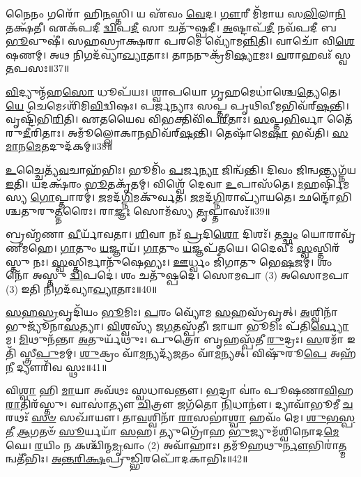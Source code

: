 𑌨𑍈𑌨𑌂 𑌗𑌰𑍋᳴ 𑌹𑌿\-\ul{𑌨}\-𑌸𑍍𑌤𑌿। 𑌯 𑌏᳴𑌵𑌂 \ul{𑌵𑍇}\-𑌦। 
\-\ul{𑌗𑍗}\-𑌰𑍀 𑌮𑌿᳴𑌮𑌾𑌯 𑌸\-\ul{𑌲𑌿}\-𑌲𑌾\-\ul{𑌨𑌿} 𑌤𑌕𑍍𑌷᳴𑌤𑍀। 𑌏𑌕᳴𑌪𑌦𑍀 \ul{𑌦𑍍𑌵𑌿}\-𑌪\-\ul{𑌦𑍀} 𑌸𑌾 𑌚𑌤𑍁᳴𑌷𑍍𑌪𑌦𑍀। 
\-\ul{𑌅}\-𑌷𑍍𑌟𑌾𑌪᳴\-\ul{𑌦𑍀} 𑌨𑌵᳴𑌪𑌦𑍀 𑌬\-\ul{𑌭𑍂}\-𑌵𑍁𑌷𑍀॑। 𑌸𑌹𑌸𑍍𑌰𑌾𑌕𑍍𑌷𑌰𑌾 𑌪𑌰𑌮𑍇 𑌵𑍍𑌯𑍋᳴𑌮\-\ul{𑌨𑍍𑌨𑌿}\-𑌤𑌿। 
𑌵𑌾𑌚𑍋᳴ 𑌵𑌿\-\ul{𑌶𑍇}\-𑌷𑌣𑌮𑍍। 𑌅𑌥 𑌨𑌿𑌗𑌦᳴𑌵𑍍𑌯𑌾\-\ul{𑌖𑍍𑌯𑌾}\-𑌤𑌾𑌃। 
𑌤𑌾𑌨𑌨𑍁𑌕𑍍𑌰᳴𑌮𑌿\-\ul{𑌷𑍍𑌯𑌾}\-𑌮𑌃। \ul{𑌵}\-𑌰𑌾𑌹𑌵𑌃᳴ 𑌸𑍍𑌵\-\ul{𑌤}\-𑌪𑌸𑌃॥37॥

\-\ul{𑌵𑌿}\-𑌦𑍍𑌯𑍁𑌨𑍍𑌮᳴𑌹\-\ul{𑌸𑍋} 𑌧𑍂𑌪᳴𑌯𑌃। 𑌶𑍍𑌵𑌾𑌪𑌯𑍋 𑌗𑍃𑌹𑌮𑍇𑌧𑌾॑𑌶𑍍𑌚𑍇\-\ul{𑌤𑍍𑌯𑍇}\-𑌤𑍇। 
\-\ul{𑌯𑍇} 𑌚𑍇𑌮𑍇𑌽𑌶𑌿᳴𑌮𑌿\-\ul{𑌵𑌿}\-\-𑌦𑍍𑌵𑌿𑌷𑌃। 𑌪𑌰𑍍𑌜𑌨𑍍𑌯𑌾𑌃 𑌸𑌪𑍍𑌤 𑌪𑍃𑌥𑌿𑌵𑍀𑌮𑌭𑌿𑌵᳴𑌰𑍍‌\-\ul{𑌷}\-𑌨𑍍𑌤𑌿। 
𑌵𑍃𑌷𑍍𑌟𑌿᳴𑌭𑌿\-\ul{𑌰𑌿}\-𑌤𑌿। 𑌏𑌤𑌯𑍈𑌵 𑌵𑌿𑌭𑌕𑍍𑌤𑌿𑌵𑌿᳴𑌪\-\ul{𑌰𑍀}\-𑌤𑌾𑌃। \ul{𑌸}\-𑌪𑍍𑌤\-\ul{𑌭𑌿}\-𑌰𑍍𑌵𑌾 𑌤𑍈᳴𑌰𑍁\-\ul{𑌦𑍀}\-𑌰𑌿𑌤𑌾𑌃। 
𑌅𑌮𑍂𑌁𑌲𑍍𑌲𑍋𑌕𑌾𑌨\-𑌭𑌿𑌵᳴𑌰𑍍‌\-\ul{𑌷}\-𑌨𑍍𑌤𑌿। 𑌤𑍇𑌷𑌾᳴𑌮𑍇\-\ul{𑌷𑌾} 𑌭𑌵᳴𑌤𑌿। \ul{𑌸}\-\-\ul{𑌮𑌾}\-𑌨\-\ul{𑌮𑍇}\-𑌤𑌦𑍁𑌦᳴𑌕𑌮𑍍॥38॥

\-\ul{𑌉}\-𑌚𑍍𑌚𑍈𑌤𑍍𑌯᳴\-\ul{𑌵}\-𑌚𑌾𑌹᳴𑌭𑌿𑌃। 𑌭𑍂𑌮𑌿𑌂᳴ \ul{𑌪}\-𑌰𑍍𑌜\-\ul{𑌨𑍍𑌯𑌾} 𑌜𑌿𑌨𑍍𑌵᳴𑌨𑍍𑌤𑌿। 𑌦𑌿𑌵𑌂 𑌜𑌿𑌨𑍍𑌵𑌨𑍍𑌤𑍍𑌯𑌗𑍍𑌨᳴𑌯 \ul{𑌇}\-𑌤𑌿। 
𑌯𑌦𑌕𑍍𑌷᳴𑌰𑌂 \ul{𑌭𑍂}\-𑌤𑌕𑍃᳴𑌤𑌮𑍍। 𑌵𑌿𑌶𑍍𑌵𑍇᳴ 𑌦𑍇𑌵𑌾 \ul{𑌉}\-𑌪𑌾𑌸᳴𑌤𑍇। \ul{𑌮}\-𑌹𑌰𑍍\mbox{}𑌷𑌿᳴𑌮𑌸𑍍𑌯 \ul{𑌗𑍋}\-𑌪𑍍𑌤𑌾𑌰𑌮𑍍॑। 
\-\ul{𑌜}\-𑌮𑌦᳴\-\ul{𑌗𑍍𑌨𑌿}\-𑌮𑌕𑍁᳴𑌰𑍍𑌵𑌤। \ul{𑌜}\-𑌮𑌦᳴\-\ul{𑌗𑍍𑌨𑌿}\-\-𑌰𑌾𑌪𑍍𑌯𑌾᳴𑌯𑌤𑍇। 
𑌛𑌨𑍍𑌦𑍋᳴𑌭𑌿𑌶𑍍𑌚𑌤𑍁𑌰𑍁\-\ul{𑌤𑍍𑌤}\-𑌰𑍈𑌃। 𑌰𑌾\-\ul{𑌜𑍍𑌞𑌃} 𑌸𑍋𑌮᳴𑌸𑍍𑌯 \ul{𑌤𑍃}\-𑌪𑍍𑌤𑌾𑌸𑌃᳴॥39॥

𑌬𑍍𑌰𑌹𑍍𑌮᳴𑌣𑌾 \ul{𑌵𑍀}\-𑌰𑍍𑌯𑌾᳴𑌵𑌤𑌾। \ul{𑌶𑌿}\-𑌵𑌾 𑌨𑌃᳴ \ul{𑌪𑍍𑌰}\-𑌦𑌿\-\ul{𑌶𑍋} 𑌦𑌿𑌶𑌃᳴। 
𑌤\-\ul{𑌚𑍍𑌛𑌂} 𑌯𑍋𑌰𑌾𑌵𑍃᳴𑌣𑍀𑌮𑌹𑍇। \ul{𑌗𑌾}\-𑌤𑍁𑌂 \ul{𑌯}\-𑌜𑍍𑌞𑌾𑌯᳴। \ul{𑌗𑌾}\-𑌤𑍁𑌂 \ul{𑌯}\-𑌜𑍍𑌞𑌪᳴𑌤𑌯𑍇। 
𑌦𑍈𑌵𑍀𑌃॑ \ul{𑌸𑍍𑌵}\-𑌸𑍍𑌤𑌿𑌰᳴𑌸𑍍𑌤𑍁 𑌨𑌃। \ul{𑌸𑍍𑌵}\-𑌸𑍍𑌤𑌿𑌰𑍍𑌮𑌾𑌨𑍁᳴𑌷𑍇𑌭𑍍𑌯𑌃। \ul{𑌊}\-𑌰𑍍𑌧𑍍𑌵𑌂 𑌜𑌿᳴𑌗𑌾𑌤𑍁 𑌭𑍇\-\ul{𑌷}\-𑌜𑌮𑍍। 
𑌶𑌂 𑌨𑍋᳴ 𑌅𑌸𑍍𑌤𑍁 \ul{𑌦𑍍𑌵𑌿}\-𑌪𑌦𑍇॑। 𑌶𑌂 𑌚𑌤𑍁᳴𑌷𑍍𑌪𑌦𑍇। 
𑌸𑍋𑌮𑌪𑌾 (3) 𑌅𑌸𑍋𑌮𑌪𑌾 (3) 𑌇𑌤𑌿 𑌨𑌿𑌗𑌦᳴𑌵𑍍𑌯𑌾\-\ul{𑌖𑍍𑌯𑌾}\-𑌤𑌾𑌃॥40॥\anuvakamend


\-\ul{𑌸}\-\-\ul{𑌹}\-\-\ul{𑌸𑍍𑌰}\-𑌵𑍃𑌦𑌿᳴𑌯𑌂 \ul{𑌭𑍂}\-𑌮𑌿𑌃। \ul{𑌪}\-𑌰𑌂 𑌵𑍍𑌯𑍋᳴𑌮 \ul{𑌸}\-𑌹𑌸𑍍𑌰᳴𑌵𑍃𑌤𑍍। \ul{𑌅}\-𑌶𑍍𑌵𑌿𑌨𑌾᳴ 𑌭𑍁𑌜𑍍𑌯𑍂᳴𑌨𑌾\-\ul{𑌸}\-𑌤𑍍𑌯𑌾। 
\-\ul{𑌵𑌿}\-𑌶𑍍𑌵𑌸𑍍𑌯᳴ 𑌜\-\ul{𑌗}\-𑌤𑌸𑍍𑌪᳴𑌤𑍀। 𑌜𑌾𑌯𑌾 𑌭𑍂𑌮𑌿𑌃 𑌪᳴𑌤𑌿\-\ul{𑌰𑍍𑌵𑍍𑌯𑍋}\-𑌮। \ul{𑌮𑌿}\-𑌥𑍁𑌨᳴𑌨𑍍𑌤𑌾 \ul{𑌅}\-𑌤𑍁𑌰𑍍𑌯᳴𑌥𑍁𑌃। 
𑌪𑍁𑌤𑍍𑌰𑍋 𑌬𑍃𑌹𑌸𑍍𑌪᳴𑌤𑍀 \ul{𑌰𑍁}\-𑌦𑍍𑌰𑌃। \ul{𑌸}\-𑌰𑌮𑌾᳴ 𑌇𑌤𑌿᳴ 𑌸𑍍𑌤𑍍𑌰𑍀\-\ul{𑌪𑍁}\-𑌮𑌮𑍍। 
\-\ul{𑌶𑍁}\-𑌕𑍍𑌰𑌂 𑌵𑌾᳴\-\ul{𑌮}\-𑌨𑍍𑌯𑌦𑍍𑌯᳴\-\ul{𑌜}\-𑌤𑌂 𑌵𑌾᳴\-\ul{𑌮}\-𑌨𑍍𑌯𑌤𑍍। 𑌵𑌿𑌷𑍁᳴𑌰𑍂\-\ul{𑌪𑍇} 𑌅𑌹᳴\-\ul{𑌨𑍀} 𑌦𑍍𑌯𑍗𑌰𑌿᳴𑌵 𑌸𑍍𑌥𑌃॥41॥



𑌵𑌿\-\ul{𑌶𑍍𑌵𑌾} 𑌹𑌿 \ul{𑌮𑌾}\-𑌯𑌾 𑌅𑌵᳴𑌥𑌃 𑌸𑍍𑌵𑌧𑌾𑌵𑌨𑍍𑌤𑍗। 
\-\ul{𑌭}\-𑌦𑍍𑌰𑌾 𑌵𑌾𑌂॑ 𑌪𑍂𑌷𑌣𑌾\-\ul{𑌵𑌿}\-𑌹 \ul{𑌰𑌾}\-𑌤𑌿𑌰᳴𑌸𑍍𑌤𑍁। 𑌵𑌾𑌸𑌾॑𑌤𑍍𑌯𑍗 \ul{𑌚𑌿}\-𑌤𑍍𑌰𑍗 𑌜𑌗᳴𑌤𑍋 \ul{𑌨𑌿}\-𑌧𑌾𑌨𑍗॑। 
𑌦𑍍𑌯𑌾𑌵𑌾᳴𑌭𑍂𑌮𑍀 \ul{𑌚}\-𑌰𑌥𑌃᳴ \ul{𑌸}\-\-\ul{𑍞} 𑌸𑌖𑌾᳴𑌯𑍗। 𑌤𑌾\-\ul{𑌵}\-𑌶𑍍𑌵𑌿𑌨𑌾᳴ \ul{𑌰𑌾}\-𑌸𑌭𑌾॑\-\ul{𑌶𑍍𑌵𑌾} 𑌹𑌵𑌂᳴ 𑌮𑍇। 
\-\ul{𑌶𑍁}\-\-\ul{𑌭}\-\-\ul{𑌸𑍍𑌪}\-\-\ul{𑌤𑍀} \ul{𑌆}\-𑌗𑌤𑍞᳴ \ul{𑌸𑍂}\-𑌰𑍍𑌯𑌯𑌾᳴ \ul{𑌸}\-𑌹। 𑌤𑍍𑌯𑍁𑌗𑍍𑌰𑍋᳴𑌹 \ul{𑌭𑍁}\-𑌜𑍍𑌯𑍁𑌮᳴𑌶𑍍𑌵𑌿𑌨𑍋𑌦\-\ul{𑌮𑍇}\-𑌘𑍇। 
\-\ul{𑌰}\-𑌯𑌿𑌂 𑌨 𑌕𑌶𑍍𑌚𑌿᳴𑌨𑍍𑌮\-\ul{𑌮𑍃}\-𑌵𑌾𑌂 (2) 𑌅𑌵𑌾᳴𑌹𑌾𑌃। 𑌤𑌮𑍂᳴𑌹𑌥𑍁\-\ul{𑌰𑍍𑌨𑍗}\-𑌭𑌿𑌰𑌾॑\-\ul{𑌤𑍍𑌮}\-𑌨𑍍𑌵𑌤𑍀᳴𑌭𑌿𑌃। 
\-\ul{𑌅}\-\-\ul{𑌨𑍍𑌤}\-\-\ul{𑌰𑌿}\-\-\ul{𑌕𑍍𑌷}\-𑌪𑍍𑌰𑍁\-\ul{𑌡𑍍𑌭𑌿}\-𑌰𑌪𑍋᳴𑌦𑌕𑌾𑌭𑌿𑌃॥42॥


